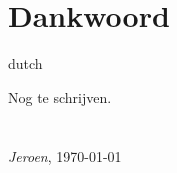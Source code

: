 \chapter*{Dankwoord}
\label{dankwoord}
\fancyhead[RO]{\thepage}
\fancyhead[LE]{\thepage}
\begin{otherlanguage*}{dutch}

Nog te schrijven.
\\
\\
\\
\noindent\textit{Jeroen}, \today
\end{otherlanguage*}
